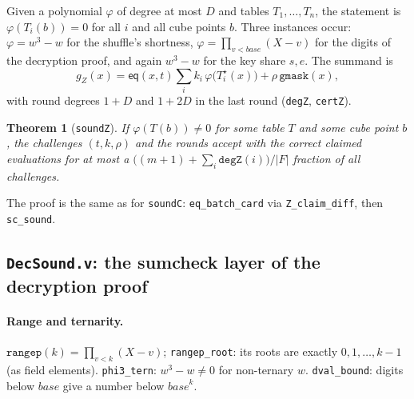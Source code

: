 \documentclass[11pt,a4paper]{article}
\newcommand{\eq}{\mathsf{eq}}
\newcommand{\msk}[1]{#1^{\star}}
\theoremstyle{definition}
\theoremstyle{plain}
\newtheorem{theorem}[definition]{Theorem}
\begin{document}
Given a polynomial $\varphi$ of degree at most $D$ and tables $T_1,\dots,T_n$, the statement is
$\varphi(T_i(b))=0$ for all $i$ and all cube points $b$. Three instances occur: $\varphi=w^3-w$ for
the shuffle's shortness, $\varphi=\prod_{v<\mathit{base}}(X-v)$ for the digits of the decryption
proof, and again $w^3-w$ for the key share $s,e$. The summand is
\[
  g_Z(x)=\eq(x,t)\sum_ik_i\,\varphi\bigl(\msk{T_i}(x)\bigr)+\rho\,\mathtt{gmask}(x),
\]
with round degrees $1+D$ and $1+2D$ in the last round (\texttt{degZ}, \texttt{certZ}).
\begin{theorem}[\texttt{soundZ}]
If $\varphi(T(b))\ne0$ for some table $T$ and some cube point $b$, the challenges $(t,k,\rho)$ and
the rounds accept with the correct claimed evaluations for at most a
$\bigl((m+1)+\sum_i\mathtt{degZ}(i)\bigr)/|F|$ fraction of all challenges.
\end{theorem}
The proof is the same as for \texttt{soundC}: \texttt{eq\_batch\_card} via \texttt{Z\_claim\_diff}, then
\texttt{sc\_sound}.

\subsection{\texttt{DecSound.v}: the sumcheck layer of the decryption proof}

\paragraph{Range and ternarity.} $\mathtt{rangep}(k)=\prod_{v<k}(X-v)$; \texttt{rangep\_root}: its roots are
exactly $0,1,\dots,k-1$ (as field elements). \texttt{phi3\_tern}: $w^3-w\ne0$ for non-ternary $w$.
\texttt{dval\_bound}: digits below $\mathit{base}$ give a number below $\mathit{base}^{k}$.
\end{document}
